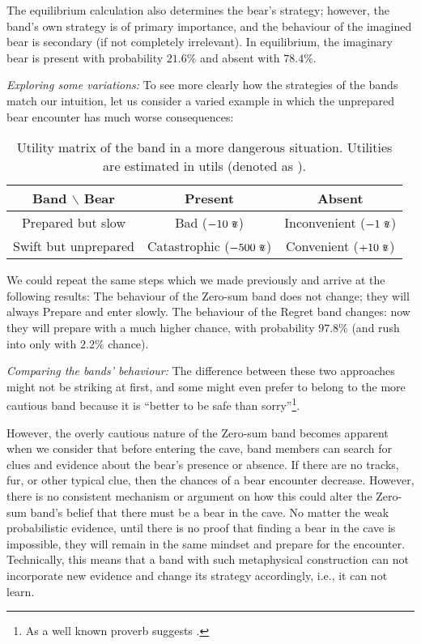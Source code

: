 \documentclass{article}
\newcommand{\util}{\scalebox{0.75}{\text{\Pfund}}}
\begin{document}
The equilibrium calculation also determines the bear's strategy; however, the band's own strategy is of primary importance, and the behaviour of the imagined bear is secondary (if not completely irrelevant).
In equilibrium, the imaginary bear is present with probability $21.6\%$ and absent with $78.4\%$.

{\it Exploring some variations:}
To see more clearly how the strategies of the bands match our intuition, let us consider a varied example in which the unprepared bear encounter has much worse consequences:


\begin{table}[h!]
    \centering
    \begin{tabular}{c|cc}
        Band $\backslash$ Bear & Present & Absent \\
        \hline
        Prepared but slow & Bad ($-10\ \util$) & Inconvenient ($-1\ \util$) \\
        Swift but unprepared & Catastrophic ($-500\ \util$) & Convenient ($+10\ \util$) \\
    \end{tabular}
    \caption{Utility matrix of the band in a more dangerous situation. Utilities are estimated in utils (denoted as \util).}
    \label{tab:BandBearUtilityMatrix2}
\end{table}

We could repeat the same steps which we made previously and arrive at the following results:
The behaviour of the Zero-sum band does not change; they will always Prepare and enter slowly.
The behaviour of the Regret band changes: now they will prepare with a much higher chance, with probability $97.8\%$ (and rush into only with $2.2\%$ chance).

{\it Comparing the bands' behaviour:}
The difference between these two approaches might not be striking at first, and some might even prefer to belong to the more cautious band because it is ``better to be safe than sorry''\footnote{As a well known proverb suggests \cite{book:Proverbs}.}.

However, the overly cautious nature of the Zero-sum band becomes apparent when we consider that before entering the cave, band members can search for clues and evidence about the bear's presence or absence.
If there are no tracks, fur, or other typical clue, then the chances of a bear encounter decrease.
However, there is no consistent mechanism or argument on how this could alter the Zero-sum band’s belief that there must be a bear in the cave.
No matter the weak probabilistic evidence, until there is no proof that finding a bear in the cave is impossible, they will remain in the same mindset and prepare for the encounter.
Technically, this means that a band with such metaphysical construction can not incorporate new evidence and change its strategy accordingly, i.e., it can not learn.
\end{document}
